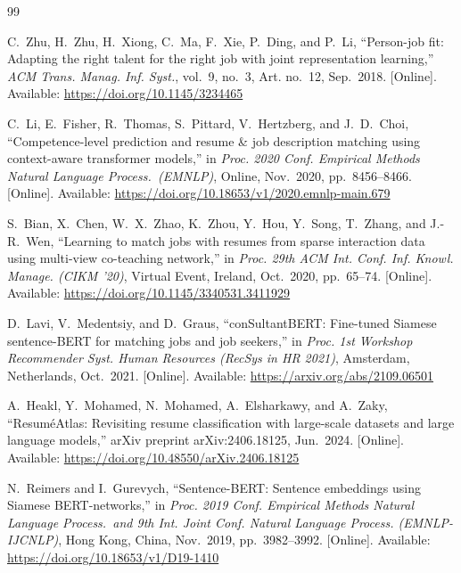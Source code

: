 \documentclass[conference]{IEEEtran}
\begin{document}

\begin{thebibliography}{99}

C.~Zhu, H.~Zhu, H.~Xiong, C.~Ma, F.~Xie, P.~Ding, and P.~Li,
``Person-job fit: Adapting the right talent for the right job with joint
representation learning,''
\textit{ACM Trans. Manag. Inf. Syst.}, vol.~9, no.~3, Art. no.~12, Sep.\ 2018.
[Online]. Available: \url{https://doi.org/10.1145/3234465}

C.~Li, E.~Fisher, R.~Thomas, S.~Pittard, V.~Hertzberg, and J.~D.~Choi,
``Competence-level prediction and resume \& job description matching using
context-aware transformer models,''
in \textit{Proc. 2020 Conf. Empirical Methods Natural Language Process.\
(EMNLP)}, Online, Nov.\ 2020, pp.~8456--8466.
[Online]. Available: \url{https://doi.org/10.18653/v1/2020.emnlp-main.679}

S.~Bian, X.~Chen, W.~X.~Zhao, K.~Zhou, Y.~Hou, Y.~Song, T.~Zhang,
and J.-R.~Wen,
``Learning to match jobs with resumes from sparse interaction data using
multi-view co-teaching network,''
in \textit{Proc. 29th ACM Int. Conf. Inf. Knowl. Manage. (CIKM '20)},
Virtual Event, Ireland, Oct.\ 2020, pp.~65--74.
[Online]. Available: \url{https://doi.org/10.1145/3340531.3411929}

D.~Lavi, V.~Medentsiy, and D.~Graus,
``conSultantBERT: Fine-tuned Siamese sentence-BERT for matching jobs and
job seekers,''
in \textit{Proc. 1st Workshop Recommender Syst. Human Resources
(RecSys in HR 2021)}, Amsterdam, Netherlands, Oct.\ 2021.
[Online]. Available: \url{https://arxiv.org/abs/2109.06501}

A.~Heakl, Y.~Mohamed, N.~Mohamed, A.~Elsharkawy, and A.~Zaky,
``Resum\'eAtlas: Revisiting resume classification with large-scale datasets
and large language models,''
arXiv preprint arXiv:2406.18125, Jun.\ 2024.
[Online]. Available: \url{https://doi.org/10.48550/arXiv.2406.18125}

N.~Reimers and I.~Gurevych,
``Sentence-BERT: Sentence embeddings using Siamese BERT-networks,''
in \textit{Proc. 2019 Conf. Empirical Methods Natural Language Process.\
and 9th Int. Joint Conf. Natural Language Process. (EMNLP-IJCNLP)},
Hong Kong, China, Nov.\ 2019, pp.~3982--3992.
[Online]. Available: \url{https://doi.org/10.18653/v1/D19-1410}


\end{thebibliography}
\end{document}
